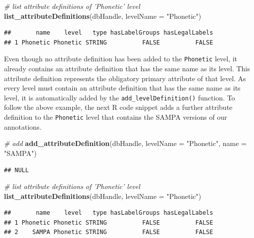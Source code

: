 \documentclass[]{book}
\newenvironment{Shaded}{\begin{snugshade}}{\end{snugshade}}
\newcommand{\CommentTok}[1]{\textcolor[rgb]{0.56,0.35,0.01}{\textit{#1}}}
\newcommand{\DataTypeTok}[1]{\textcolor[rgb]{0.13,0.29,0.53}{#1}}
\newcommand{\KeywordTok}[1]{\textcolor[rgb]{0.13,0.29,0.53}{\textbf{#1}}}
\newcommand{\NormalTok}[1]{#1}
\newcommand{\StringTok}[1]{\textcolor[rgb]{0.31,0.60,0.02}{#1}}
\theoremstyle{definition}
\theoremstyle{definition}
\theoremstyle{definition}
\theoremstyle{remark}
\begin{document}
\begin{Shaded}
\begin{Highlighting}[]
\CommentTok{# list attribute definitions of 'Phonetic' level}
\KeywordTok{list_attributeDefinitions}\NormalTok{(dbHandle,}
                          \DataTypeTok{levelName =} \StringTok{"Phonetic"}\NormalTok{)}
\end{Highlighting}
\end{Shaded}

\begin{verbatim}
##       name    level   type hasLabelGroups hasLegalLabels
## 1 Phonetic Phonetic STRING          FALSE          FALSE
\end{verbatim}

Even though no attribute definition has been added to the
\texttt{Phonetic} level, it already contains an attribute definition
that has the same name as its level. This attribute definition
represents the obligatory primary attribute of that level. As every
level must contain an attribute definition that has the same name as its
level, it is automatically added by the \texttt{add\_levelDefinition()}
function. To follow the above example, the next R code snippet adds a
further attribute definition to the \texttt{Phonetic} level that
contains the SAMPA versions of our annotations.

\begin{Shaded}
\begin{Highlighting}[]
\CommentTok{# add}
\KeywordTok{add_attributeDefinition}\NormalTok{(dbHandle,}
                        \DataTypeTok{levelName =} \StringTok{"Phonetic"}\NormalTok{,}
                        \DataTypeTok{name =} \StringTok{"SAMPA"}\NormalTok{)}
\end{Highlighting}
\end{Shaded}

\begin{verbatim}
## NULL
\end{verbatim}

\begin{Shaded}
\begin{Highlighting}[]
\CommentTok{# list attribute definitions of 'Phonetic' level}
\KeywordTok{list_attributeDefinitions}\NormalTok{(dbHandle,}
                          \DataTypeTok{levelName =} \StringTok{"Phonetic"}\NormalTok{)}
\end{Highlighting}
\end{Shaded}

\begin{verbatim}
##       name    level   type hasLabelGroups hasLegalLabels
## 1 Phonetic Phonetic STRING          FALSE          FALSE
## 2    SAMPA Phonetic STRING          FALSE          FALSE
\end{verbatim}
\end{document}
